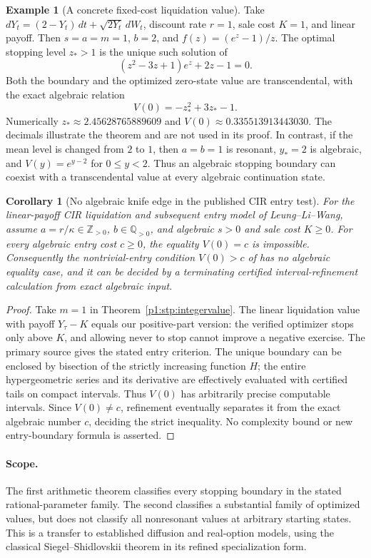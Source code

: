 \documentclass[11pt,a4paper]{article}
\newtheorem{corollary}[theorem]{Corollary}
\theoremstyle{definition}
\newtheorem{example}[theorem]{Example}
\theoremstyle{remark}
\numberwithin{equation}{section}
\begin{document}
\begin{example}[A concrete fixed-cost liquidation value]
Take $dY_t=(2-Y_t)\,dt+\sqrt{2Y_t}\,dW_t$, discount rate $r=1$,
sale cost $K=1$, and linear payoff.  Then $s=a=m=1$, $b=2$,
and $f(z)=(e^z-1)/z$.  The optimal stopping level $z_*>1$ is
the unique such solution of
\[
 (z^2-3z+1)e^z+2z-1=0.
\]
Both the boundary and the optimized zero-state value are
transcendental, with the exact algebraic relation
\[
                       V(0)=-z_*^2+3z_*-1.
\]
Numerically $z_*\approx2.45628765889609$ and
$V(0)\approx0.335513913443030$.  The decimals illustrate the
theorem and are not used in its proof.  In contrast, if the mean
level is changed from $2$ to $1$, then $a=b=1$ is resonant,
$y_*=2$ is algebraic, and $V(y)=e^{y-2}$ for $0\le y<2$.
Thus an algebraic stopping boundary can coexist with a
transcendental value at every algebraic continuation state.
\end{example}

\begin{corollary}[No algebraic knife edge in the published CIR entry test]
\label{p1:stp:entry}
For the linear-payoff CIR liquidation and subsequent entry model of
Leung--Li--Wang, assume $a=r/\kappa\in\mathbb Z_{>0}$,
$b\in\mathbb Q_{>0}$, and algebraic $s>0$ and sale cost $K\ge0$.
For every algebraic entry cost $c\ge0$, the equality $V(0)=c$
is impossible.  Consequently the nontrivial-entry condition
$V(0)>c$ of \cite[Equation~(3.7)]{p1:LLW2018} has no algebraic
equality case, and it can be decided by a terminating certified
interval-refinement calculation from exact algebraic input.
\end{corollary}
\begin{proof}
Take $m=1$ in Theorem~\ref{p1:stp:integervalue}.  The linear
liquidation value with payoff $Y_\tau-K$ equals our positive-part
version: the verified optimizer stops only above $K$, and allowing
never to stop cannot improve a negative exercise.  The primary
source gives the stated entry criterion.  The unique boundary can
be enclosed by bisection of the strictly increasing function $H$;
the entire hypergeometric series and its derivative are effectively
evaluated with certified tails on compact intervals.  Thus $V(0)$
has arbitrarily precise computable intervals.  Since $V(0)\ne c$,
refinement eventually separates it from the exact algebraic number
$c$, deciding the strict inequality.  No complexity bound or new
entry-boundary formula is asserted.
\end{proof}

\paragraph{Scope.}
The first arithmetic theorem classifies every stopping boundary in
the stated rational-parameter family.  The second classifies a
substantial family of optimized values, but does not classify all
nonresonant values at arbitrary starting states.  This is a transfer
to established diffusion and real-option models, using the classical
Siegel--Shidlovskii theorem in its refined specialization form.
\end{document}
